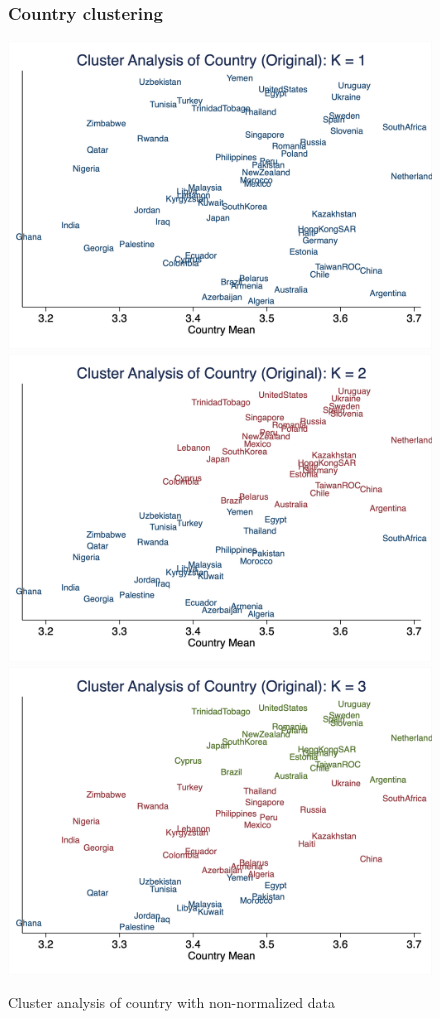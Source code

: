 \documentclass[10pt,leqno]{article}
\begin{document}
\begin{figure}  [h!]
\subsubsection{Country clustering}
\begin{center}
\caption{Cluster analysis of country with non-normalized data}
\includegraphics[scale=0.15]{CA_CountryK1_ORI.png}
\includegraphics[scale=0.15]{CA_CountryK2_ORI.png}
\includegraphics[scale=0.15]{CA_CountryK3_ORI.png}

\end{center}
\end{figure}
\end{document}
